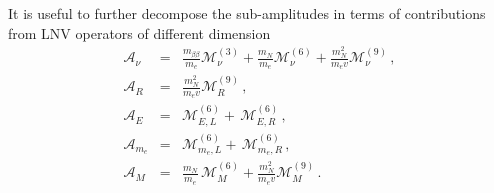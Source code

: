 \documentclass[letterpaper,11pt]{article}
\newcommand{\nn}{\nonumber}
\begin{document}
It is useful to further decompose the sub-amplitudes in terms of contributions from LNV operators of different dimension 
\begin{eqnarray}\label{MSM1}
\mathcal{ A}_{\nu} &=& \frac{m_{\beta \beta} }{m_e} \mathcal M^{(3)}_{\nu}  +  \frac{m_N}{m_e}  \mathcal M^{(6)}_{\nu} +    \frac{m^2_N}{m_e v} \mathcal M^{(9)}_{\nu}\,,
\nn \\
\mathcal A_R &=& \frac{m^2_N}{m_e v} \mathcal M^{(9)}_{R}\, , \nn\\
\mathcal A_{E} &=&  \mathcal M^{(6)}_{E,L} +  \, \mathcal M^{(6)}_{E,R} \, ,  \nn \\
\mathcal A_{m_e} &=& \mathcal M^{(6)}_{m_e,L} +  \,\mathcal M^{(6)}_{m_e,R} \,,\nn \\
\mathcal A_{ M} &=&  \frac{m_N}{m_e}    \, \mathcal M^{(6)}_{M} +  \frac{m_N^2}{m_e v} \mathcal M^{(9)}_{M}\,.
\end{eqnarray}
\end{document}
